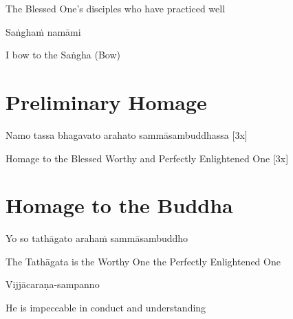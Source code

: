 \begin{english}
  The Blessed One’s disciples who have practiced well
\end{english}

Saṅghaṁ namāmi

\begin{english}
  I bow to the Saṅgha \hfill{(Bow)}
\end{english}

\section{Preliminary Homage}
\label{preliminary-homage}

\begin{leader}
\end{leader}

\begin{leader}
\end{leader}

Namo tassa bhagavato arahato sammāsambuddhassa \hfill{[3x]}

\begin{english}
  Homage to the Blessed Worthy and Perfectly Enlightened One \hfill{[3x]}
\end{english}

\section{Homage to the Buddha}
\label{homage-buddha}

\begin{leader}
\end{leader}
\begin{leader}
\end{leader}

Yo so tathāgato arahaṁ sammāsambuddho

\begin{english}
  The Tathāgata is the Worthy One the Perfectly Enlightened One
\end{english}

Vijjācaraṇa-sampanno

\begin{english}
  He is impeccable in conduct and understanding
\end{english}

